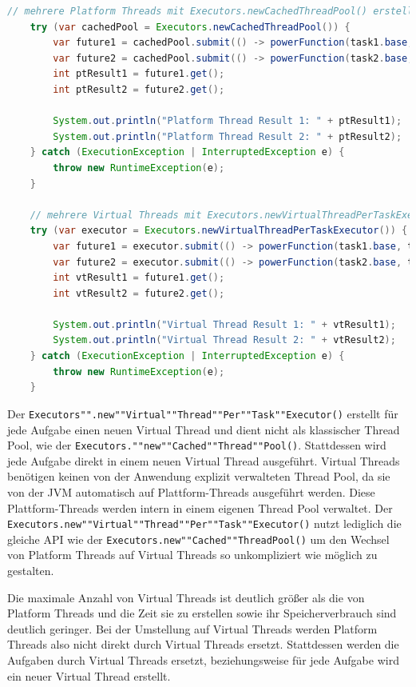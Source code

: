 \documentclass[fontsize=12pt,paper=a4,twoside=semi,parskip=half-,headsepline,headinclude]{scrreprt}
\newcommand{\code}[1]{\texttt{#1}}
\begin{document}
\begin{lstlisting}[language=Java]
	// mehrere Platform Threads mit Executors.newCachedThreadPool() erstellen
	try (var cachedPool = Executors.newCachedThreadPool()) {
		var future1 = cachedPool.submit(() -> powerFunction(task1.base, task1.exponent));
		var future2 = cachedPool.submit(() -> powerFunction(task2.base, task2.exponent));
		int ptResult1 = future1.get();
		int ptResult2 = future2.get();
	
		System.out.println("Platform Thread Result 1: " + ptResult1);
		System.out.println("Platform Thread Result 2: " + ptResult2);
	} catch (ExecutionException | InterruptedException e) {
		throw new RuntimeException(e);
	}

	// mehrere Virtual Threads mit Executors.newVirtualThreadPerTaskExecutor() erstellen
	try (var executor = Executors.newVirtualThreadPerTaskExecutor()) {
		var future1 = executor.submit(() -> powerFunction(task1.base, task1.exponent));
		var future2 = executor.submit(() -> powerFunction(task2.base, task2.exponent));
		int vtResult1 = future1.get();
		int vtResult2 = future2.get();
	
		System.out.println("Virtual Thread Result 1: " + vtResult1);
		System.out.println("Virtual Thread Result 2: " + vtResult2);
	} catch (ExecutionException | InterruptedException e) {
		throw new RuntimeException(e);
	}
\end{lstlisting}
Der \code{Executors"".new""Virtual""Thread""Per""Task""Executor()} erstellt für jede Aufgabe einen neuen Virtual Thread und dient nicht als klassischer Thread Pool, wie der \code{Executors.""new""Cached""Thread""Pool()}. Stattdessen wird jede Aufgabe direkt in einem neuen Virtual Thread ausgeführt. Virtual Threads benötigen keinen von der Anwendung explizit verwalteten Thread Pool, da sie von der JVM automatisch auf Plattform-Threads ausgeführt werden. Diese Plattform-Threads werden intern in einem eigenen Thread Pool verwaltet. Der \code{Executors.new""Virtual""Thread""Per""Task""Executor()} nutzt lediglich die gleiche API wie der \code{Executors.new""Cached""ThreadPool()} um den Wechsel von Platform Threads auf Virtual Threads so unkompliziert wie möglich zu gestalten.

Die maximale Anzahl von Virtual Threads ist deutlich größer als die von Platform Threads und die Zeit sie zu erstellen sowie ihr Speicherverbrauch sind deutlich geringer. Bei der Umstellung auf Virtual Threads werden Platform Threads also nicht direkt durch Virtual Threads ersetzt. Stattdessen werden die Aufgaben durch Virtual Threads ersetzt, beziehungsweise für jede Aufgabe wird ein neuer Virtual Thread erstellt. 
\end{document}
